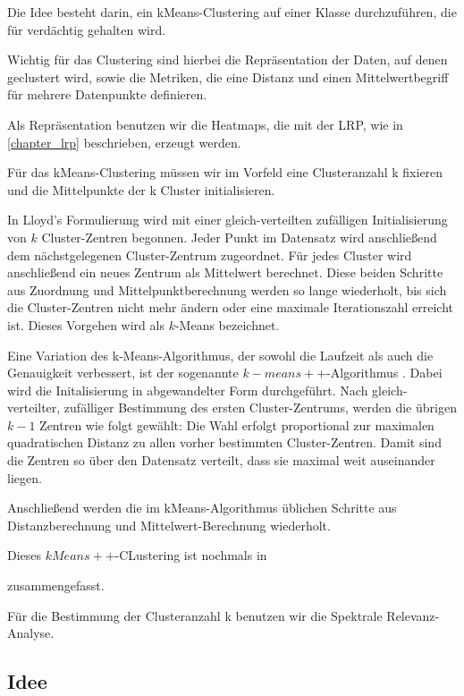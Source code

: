 \documentclass[11pt,a4paper]{article}
\numberwithin{equation}{section}
\begin{document}
	Die Idee besteht darin, ein kMeans-Clustering auf einer Klasse durchzuführen, die für verdächtig gehalten wird.
	
	Wichtig für das Clustering sind hierbei die Repräsentation der Daten, auf denen geclustert wird, sowie die Metriken, die eine Distanz und einen Mittelwertbegriff für mehrere Datenpunkte definieren.
	
	Als Repräsentation benutzen wir die Heatmaps, die mit der LRP, wie in \autoref{chapter_lrp} beschrieben, erzeugt werden.
	
	Für das kMeans-Clustering müssen wir im Vorfeld eine Clusteranzahl k fixieren und die Mittelpunkte der k Cluster initialisieren.
	
	In Lloyd's Formulierung \cite{lloyd1982least} wird mit einer gleich-verteilten zufälligen Initialisierung von $k$ Cluster-Zentren begonnen. Jeder Punkt im Datensatz wird anschließend dem nächstgelegenen Cluster-Zentrum zugeordnet. Für jedes Cluster wird anschließend ein neues Zentrum als Mittelwert berechnet.
	Diese beiden Schritte aus Zuordnung und Mittelpunktberechnung werden so lange wiederholt, bis sich die Cluster-Zentren nicht mehr ändern oder eine maximale Iterationszahl erreicht ist. Dieses Vorgehen wird als $k$-Means bezeichnet.
	
	Eine Variation des k-Means-Algorithmus, der sowohl die Laufzeit als auch die Genauigkeit verbessert, ist der sogenannte $k-means++$-Algorithmus \cite{kmeans++}. Dabei wird die Initalisierung in abgewandelter Form durchgeführt. Nach gleich-verteilter, zufälliger Bestimmung des ersten Cluster-Zentrums, werden die übrigen $k-1$ Zentren wie folgt gewählt:
	Die Wahl erfolgt proportional zur maximalen quadratischen Distanz zu allen vorher bestimmten Cluster-Zentren. Damit sind die Zentren so über den Datensatz verteilt, dass sie maximal weit auseinander liegen.
	
	Anschließend werden die im kMeans-Algorithmus üblichen Schritte aus Distanzberechnung und Mittelwert-Berechnung wiederholt.
	
	Dieses $kMeans++$-CLustering ist nochmals in 
	
	
	zusammengefasst.
	
	
	Für die Bestimmung der Clusteranzahl k benutzen wir die Spektrale Relevanz-Analyse.
	
	
	
	
	\subsection{Idee}
	
\end{document}
